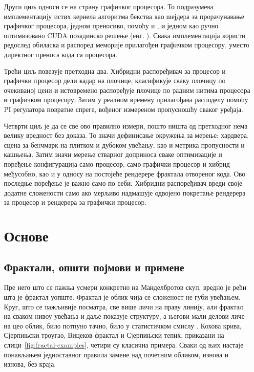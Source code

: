 \documentclass[serbian]{ftndiplomski}
\begin{document}
Други циљ односи се на страну графичког процесора. То подразумева имплементацију истих
кернела алгоритма бекства као шејдера за прорачунавање графичког процесора, једном
преносиво, помоћу  и , и једном као ручно оптимизовано CUDA
позадинско решење (енг. ). Свака имплементација користи редослед обиласка и распоред меморије
прилагођен графичком процесору, уместо директног преноса кода са процесора.

Трећи циљ повезује претходна два. Хибридни распоређивач за процесор и графички процесор
дели кадар на плочице, класификује сваку плочицу по очекиваној цени и истовремено
распоређује плочице по радним нитима процесора и графичком процесору. Затим у реалном
времену прилагођава расподелу помоћу PI регулатора повратне спреге, вођеног измереном
пропусношћу сваког уређаја.

Четврти циљ је да се све ово правилно измери, пошто ништа од претходног нема велику
вредност без доказа. То значи дефинисање окружења за мерење: хардвера, сцена за
бенчмарк на плитком и дубоком увећању, као и метрика пропусности и кашњења. Затим значи
мерење стварног доприноса сваке оптимизације и поређење конфигурација само-процесор,
само-графички-процесор и хибрид међусобно, као и у односу на постојеће рендерере
фрактала отвореног кода. Ово последње поређење је важно само по себи. Хибридни
распоређивач вреди своје додатне сложености само ако мерљиво надмашује одвојено
покретање рендерера за процесор и рендерера за графички процесор.

\chapter{Основе}
\label{ch:background}

\section{Фрактали, општи појмови и примене}
\label{sec:fractal-concepts}

Пре него што се пажња усмери конкретно на Манделбротов скуп, вредно је рећи шта је
фрактал уопште. Фрактал је облик чија се сложеност не губи увећањем. Круг, што се
пажљивије посматра, све више личи на праву линију, али фрактал на сваком нивоу увећања
и даље показује структуру, а његови мали делови личе на цео облик, било потпуно тачно,
било у статистичком смислу \cite{mandelbrot1982}. Кохова крива, Сјерпињски троугао,
Вицеков фрактал и Сјерпињски тепих, приказани на слици~\ref{fig:fractal-examples},
четири су класична примера. Сваки од њих настаје понављањем једноставног правила
замене над почетним обликом, изнова и изнова, без краја.
\end{document}
